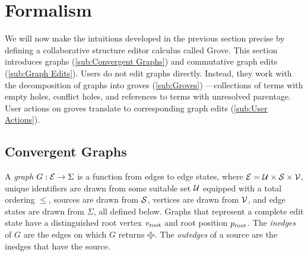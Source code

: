 
\section{Formalism}%
\label{sec:Formalism}


We will now make the intuitions developed in the previous section precise by defining a collaborative structure editor calculus called Grove.
This section introduces
  graphs (\autoref{sub:Convergent Graphs})
  and commutative graph edits (\autoref{sub:Graph Edits}).
Users do not edit graphs directly.
Instead, they work with the decomposition of graphs into groves (\autoref{sub:Groves})%
---collections of terms with empty holes, conflict holes, and references to terms with unresolved parentage.
User actions on groves translate to corresponding graph edits (\autoref{sub:User Actions}).







\subsection{Convergent Graphs}%
\label{sub:Convergent Graphs}


A \emph{graph} $G : \E \rightarrow \Sigma$ is a function from edges to edge states,
  where $\E = \U \times \S \times \V$,
  unique identifiers are drawn from some suitable set $\U$ equipped with a total ordering $\leq$,
  sources are drawn from $\S$,
  vertices are drawn from $\V$,
  and edge states are drawn from $\Sigma$,
  all defined below.
Graphs that represent a complete edit state have a distinguished
  root vertex $\rootVertex$
  and root position $\rootPosition$.
The \emph{inedges} of $G$ are the edges on which $G$ returns $\Plus$.
The \emph{outedges} of a source are the inedges that have the source.

